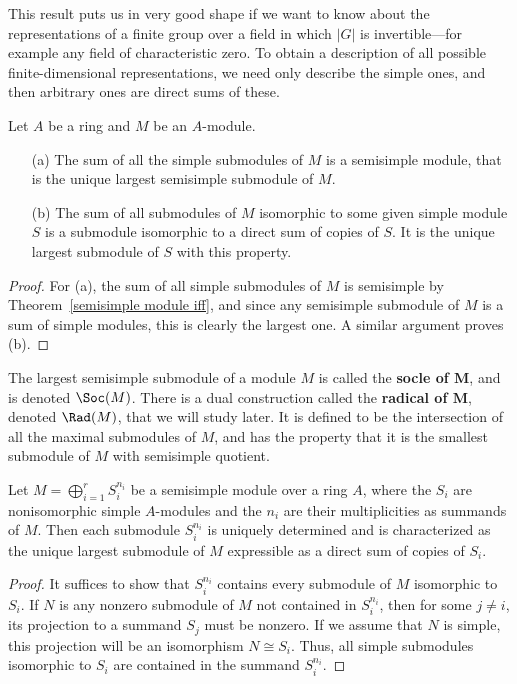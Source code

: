 This result puts us in very good shape if we want to know about the representations of a finite group over a field in which $|G|$ is invertible---for example any field of characteristic zero. To obtain a description of all possible finite-dimensional representations, we need only describe the simple ones, and then arbitrary ones are direct sums of these.\par
\begin{proposition}
Let $A$ be a ring and $M$ be an $A$-module.
\begin{itemize}
\item[(a)] The sum of all the simple submodules of $M$ is a semisimple module, that is the unique largest semisimple submodule of $M$.
\item[(b)] The sum of all submodules of $M$ isomorphic to some given simple module $S$ is a submodule isomorphic to a direct sum of copies of $S$. It is the unique largest submodule of $S$ with this property.
\end{itemize}
\end{proposition}
\begin{proof}
For (a), the sum of all simple submodules of $M$ is semisimple by Theorem~\ref{semisimple module iff}, and since any semisimple submodule of $M$ is a sum of simple modules, this is clearly the largest one. A similar argument proves (b).
\end{proof}
The largest semisimple submodule of a module $M$ is called the \textbf{socle of $\bm{M}$}, and is denoted $\Soc(M)$. There is a dual construction called the \textbf{radical of $\bm{M}$}, denoted $\Rad(M)$, that we will study later. It is defined to be the intersection of all the maximal submodules of $M$, and has the property that it is the smallest submodule of $M$ with semisimple quotient.
\begin{proposition}\label{direct sum of simple module summand char}
Let $M=\bigoplus_{i=1}^{r}S_i^{n_i}$ be a semisimple module over a ring $A$, where the $S_i$ are nonisomorphic simple $A$-modules and the $n_i$ are their multiplicities as summands of $M$. Then each submodule $S_i^{n_i}$ is uniquely determined and is characterized as the unique largest submodule of $M$ expressible as a direct sum of copies of $S_i$.
\end{proposition}
\begin{proof}
It suffices to show that $S_i^{n_i}$ contains every submodule of $M$ isomorphic to $S_i$. If $N$ is any nonzero submodule of $M$ not contained in $S_i^{n_i}$, then for some $j\neq i$, its projection to a summand $S_j$ must be nonzero. If we assume that $N$ is simple, this projection will be an isomorphism $N\cong S_i$. Thus, all simple submodules isomorphic to $S_i$ are contained in the summand $S_i^{n_i}$.
\end{proof}
